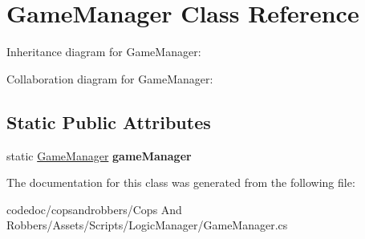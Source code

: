 \hypertarget{classGameManager}{}\section{Game\+Manager Class Reference}
\label{classGameManager}


Inheritance diagram for Game\+Manager\+:


Collaboration diagram for Game\+Manager\+:
\subsection*{Static Public Attributes}
\begin{DoxyCompactItemize}
\item 
\mbox{\label{classGameManager_a12d2ff28754c10ea03d7ac68d605bcab}} 
static \hyperlink{classGameManager}{Game\+Manager} {\bfseries game\+Manager}
\end{DoxyCompactItemize}


The documentation for this class was generated from the following file\+:\begin{DoxyCompactItemize}
\item 
codedoc/copsandrobbers/\+Cops And Robbers/\+Assets/\+Scripts/\+Logic\+Manager/Game\+Manager.\+cs\end{DoxyCompactItemize}
